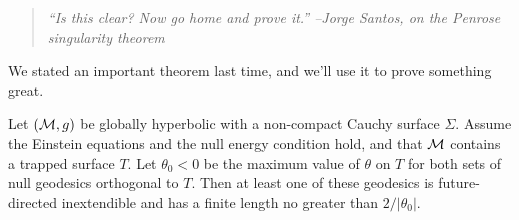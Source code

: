\begin{quote}
    \textit{``Is this clear? Now go home and prove it.'' --Jorge Santos, on the Penrose singularity theorem}
\end{quote}
We stated an important theorem last time, and we'll use it to prove something great.

\begin{thm}
    Let $(\mathcal{M},g)$ be globally hyperbolic with a non-compact Cauchy surface $\Sigma$. Assume the Einstein equations and the null energy condition hold, and that $\mathcal{M}$ contains a trapped surface $T$. Let $\theta_0 < 0$ be the maximum value of $\theta$ on $T$ for both sets of null geodesics orthogonal to $T$. Then at least one of these geodesics is future-directed inextendible and has a finite length no greater than $2/|\theta_0|.$
\end{thm}
